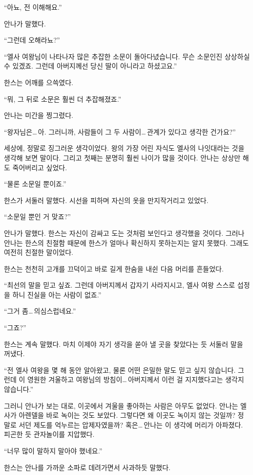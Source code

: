 ``아뇨, 전 이해해요.''

안나가 말했다.

``그런데 오해라뇨?''

``엘사 여왕님이 나타나자 많은 추잡한 소문이 돌아다녔습니다. 무슨 소문인진 상상하실 수 있겠죠. 그런데 아버지께선 당신 딸이 아니라고 하셨고요.''

한스는 어깨를 으쓱였다.

``뭐, 그 뒤로 소문은 훨씬 더 추잡해졌죠.''

안나는 미간을 찡그렸다.

``왕자님은\ldots\,아. 그러니까, 사람들이 그 두 사람이\ldots\,관계가 있다고 생각한 건가요?''

세상에, 정말로 징그러운 생각이었다. 왕의 가장 어린 자식도 엘사의 나잇대라는 것을 생각해 보면 말이다. 그리고 첫째는 분명히 훨씬 나이가 많을 것이다. 안나는 상상만 해도 죽어버리고 싶었다.

``물론 소문일 뿐이죠.''

한스가 서둘러 말했다. 시선을 피하며 자신의 옷을 만지작거리고 있었다.

`` 소문일 뿐인 거 맞죠?''

안나가 말했다. 한스는 자신이 감싸고 도는 것처럼 보인다고 생각했을 것이다. 그러나 안나는 한스의 친절함 때문에 한스가 얼마나 확신하지 못하는지는 알지 못했다. 그래도 여전히 친절한 말이었다.

한스는 천천히 고개를 끄덕이고 바로 길게 한숨을 내쉰 다음 머리를 흔들었다.

``최선의 말을 믿고 싶죠. 그런데 아버지께서 갑자기 사라지시고, 엘사 여왕 스스로 섭정을 하니 진실을 아는 사람이 없죠.''

``그거 좀\ldots\,의심스럽네요.''

``그죠?''

한스는 계속 말했다. 마치 이제야 자기 생각을 쏟아 낼 곳을 찾았다는 듯 서둘러 말을 꺼냈다.

``전 엘사 여왕을 몇 해 동안 알아왔고, 물론 어떤 은밀한 말도 믿고 싶지 않습니다. 그런데 이 영원한 겨울하고 여왕님의 방침이\ldots\,아버지께서 이런 걸 지지했다고는 생각지 않습니다.''

그러니 안나가 보는 대로, 이곳에서 겨울을 좋아하는 사람은 아무도 없었다. 안나는 엘사가 아렌델을 바로 녹이는 것도 보았다. 그렇다면 왜 이곳도 녹이지 않는 것일까? 정말로 서던 제도를 억누르는 압제자였을까? 혹은\ldots\,안나는 이 생각에 머리가 아파졌다. 피곤한 듯 관자놀이를 지압했다.

``너무 많이 말하지 말아야 했네요.''

한스는 안나를 가까운 소파로 데려가면서 사과하듯 말했다.

